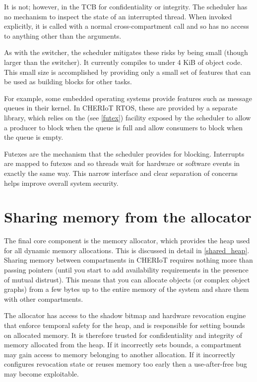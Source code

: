 It is not; however, in the TCB for confidentiality or integrity.
The scheduler has no mechanism to inspect the state of an interrupted thread.
When invoked explicitly, it is called with a normal cross-compartment call and so has no access to anything other than the arguments.

As with the switcher, the scheduler mitigates these risks by being small (though larger than the switcher).
It currently compiles to under 4 KiB of object code.
This small size is accomplished by providing only a small set of features that can be used as building blocks for other tasks.

For example, some embedded operating systems provide features such as message queues in their kernel.
In CHERIoT RTOS, these are provided by a separate library, which relies on the  (see \ref{futex}) facility exposed by the scheduler to allow a producer to block when the queue is full and allow consumers to block when the queue is empty.

Futexes are the  mechanism that the scheduler provides for blocking.
Interrupts are mapped to futexes and so threads wait for hardware or software events in exactly the same way.
This narrow interface and clear separation of concerns helps improve overall system security.

\section{Sharing memory from the allocator}

The final core component is the memory allocator, which provides the heap used for all dynamic memory allocations.
This is discussed in detail in \ref{shared_heap}.
Sharing memory between compartments in CHERIoT requires nothing more than passing pointers (until you start to add availability requirements in the presence of mutual distrust).
This means that you can allocate objects (or complex object graphs) from a few bytes up to the entire memory of the system and share them with other compartments.

The allocator has access to the shadow bitmap and hardware revocation engine that enforce temporal safety for the heap, and is responsible for setting bounds on allocated memory.
It is therefore trusted for confidentiality and integrity of memory allocated from the heap.
If it incorrectly sets bounds, a compartment may gain access to memory belonging to another allocation.
If it incorrectly configures revocation state or reuses memory too early then a use-after-free bug may become exploitable.

